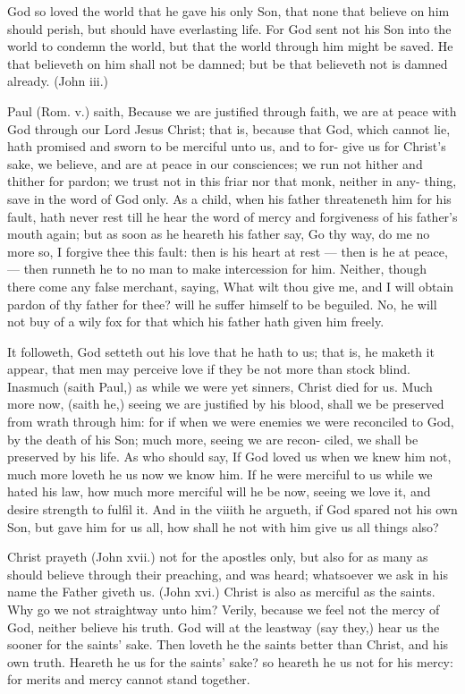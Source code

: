 \documentclass{custom}
\begin{document}
God so loved the world that he gave his only Son, that 
none that believe on him should perish, but should have 
everlasting life. For God sent not his Son into the world 
to condemn the world, but that the world through him 
might be saved. He that believeth on him shall not be 
damned; but be that believeth not is damned already. 
(John iii.) 

Paul (Rom. v.) saith, Because we are justified through 
faith, we are at peace with God through our Lord Jesus 
Christ; that is, because that God, which cannot lie, hath 
promised and sworn to be merciful unto us, and to for- 
give us for Christ's sake, we believe, and are at peace in 
our consciences; we run not hither and thither for pardon; 
we trust not in this friar nor that monk, neither in any- 
thing, save in the word of God only. As a child, when 
his father threateneth him for his fault, hath never rest till 
he hear the word of mercy and forgiveness of his father's 
mouth again; but as soon as he heareth his father say, 
Go thy way, do me no more so, I forgive thee this fault: 
then is his heart at rest — then is he at peace, — then 
runneth he to no man to make intercession for him. 
Neither, though there come any false merchant, saying, 
What wilt thou give me, and I will obtain pardon of thy 
father for thee? will he suffer himself to be beguiled. 
No, he will not buy of a wily fox for that which his father 
hath given him freely. 

It followeth, God setteth out his love that he hath to us; 
that is, he maketh it appear, that men may perceive love if 
they be not more than stock blind. Inasmuch (saith 
Paul,) as while we were yet sinners, Christ died for us. 
Much more now, (saith he,) seeing we are justified by his 
blood, shall we be preserved from wrath through him: 
for if when we were enemies we were reconciled to God, 
by the death of his Son; much more, seeing we are recon- 
ciled, we shall be preserved by his life. As who should 
say, If God loved us when we knew him not, much more 
loveth he us now we know him. If he were merciful to 
us while we hated his law, how much more merciful will 
he be now, seeing we love it, and desire strength to fulfil 
it. And in the viiith he argueth, if God spared not his 
own Son, but gave him for us all, how shall he not with 
him give us all things also? 

Christ prayeth (John xvii.) not for the apostles only, but 
also for as many as should believe through their preaching, 
and was heard; whatsoever we ask in his name the Father 
giveth us. (John xvi.) Christ is also as merciful as the 
saints. Why go we not straightway unto him? Verily, 
because we feel not the mercy of God, neither believe his 
truth. God will at the leastway (say they,) hear us the 
sooner for the saints' sake. Then loveth he the saints 
better than Christ, and his own truth. Heareth he us for 
the saints' sake? so heareth he us not for his mercy: for 
merits and mercy cannot stand together. 
\end{document}
